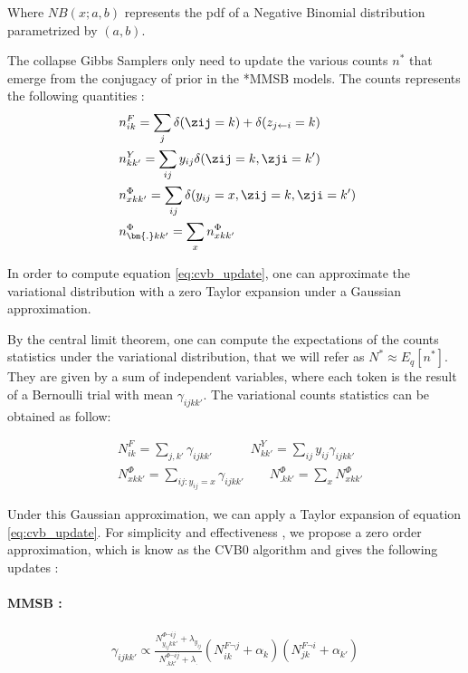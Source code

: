 Where $NB(x;a, b)$ represents the pdf of a Negative Binomial distribution parametrized by $(a,b)$.

The collapse Gibbs Samplers only need to update the various counts $n^*$ that emerge from the conjugacy of prior in the *MMSB models. The counts represents the following quantities :
\begin{align*}
&n^{F}_{ik} = \sum_j \delta(\zij=k) + \delta(z_{j\leftarrow i}=k) \\  
&n^{Y}_{kk'} = \sum_{ij} y_{ij}\delta(\zij=k, \zji=k') \\
&n^{\Phi}_{xkk'} = \sum_{ij} \delta(y_{ij}=x, \zij=k, \zji=k') \\
&n^{\Phi}_{\bm{.}kk'} = \sum_x n^{\Phi}_{xkk'}
\end{align*}

In order to compute equation \eqref{eq:cvb_update}, one can approximate the variational distribution with a zero Taylor expansion under a Gaussian approximation. 

By the central limit theorem, one can compute the expectations of the counts statistics under the variational distribution, that we will refer as $N^* \approx E_q[n^*]$. They are given by a sum of independent variables, where each token is the result of a Bernoulli trial with mean $\gamma_{ijkk'}$. The variational counts statistics can be obtained as follow:

\begin{align} \label{eq:stat_cvb}
    &N^{F}_{ik} = \sum_{j, k'} \gamma_{ijkk'} \qquad\quad  N^{Y}_{kk'} = \sum_{ij} y_{ij}\gamma_{ijkk'} \\
    &N^{\Phi}_{xkk'} = \sum_{ij:y_{ij}=x} \gamma_{ijkk'} \qquad  N^{\Phi}_{\bm{.}kk'} = \sum_x N^{\Phi}_{xkk'}
\end{align}

Under this Gaussian approximation, we can apply a Taylor expansion of equation \eqref{eq:cvb_update}. For simplicity and effectiveness \cite{asuncion2009smoothing}, we propose a zero order approximation, which is know as the CVB0 algorithm and gives the following updates :

\paragraph{MMSB :}
\begin{align*}
\gamma_{ijkk'} \propto  \frac{ N^{\Phi\neg ij}_{y_{ij}kk'} + \lambda_{y_{ij}}}{N^{\Phi\neg ij}_{\bm{.}kk'} + \lambda_{\bm{.}}} (N^{F\neg j}_{ik} + \alpha_k) (N^{F\neg i}_{jk} + \alpha_{k'}) 
\end{align*}

